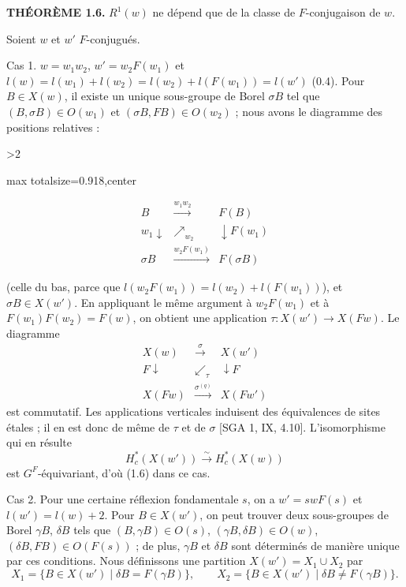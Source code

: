 \documentclass[9pt,twoside]{extarticle}
\newcommand{\EditionPage}[3]{%
  \ifnum#1>2\clearpage\fi
  \pdfbookmark[1]{Printed page #2}{fr-folio-#2}%
  \hypertarget{fr-physical-#1}{}%
  \noindent\begin{adjustbox}{max totalsize={\textwidth}{0.918\textheight},center}
  \begin{minipage}[t]{\textwidth}
  \fontsize{9.4}{11.1}\selectfont\justifying
  #3
  \end{minipage}
  \end{adjustbox}%
}
\begin{document}
{\noindent\textbf{THÉORÈME 1.6.} \(R^1(w)\) ne dépend que de la classe de \(F\)-conjugaison de \(w\).\par

Soient \(w\) et \(w'\)  \(F\)-conjugués.\par

Cas 1. \(w=w_1w_2\), \(w'=w_2F(w_1)\) et \(l(w)=l(w_1)+l(w_2)=l(w_2)+l(F(w_1))=l(w')\) (0.4). Pour \(B\in X(w)\), il existe un unique sous-groupe de Borel \(\sigma B\) tel que \((B,\sigma B)\in O(w_1)\) et \((\sigma B,FB)\in O(w_2)\) ; nous avons le diagramme des positions relatives :\par
}

\EditionPage{7}{108}{%
\[
\begin{array}{ccc}
B & \xrightarrow{w_1w_2} & F(B)\\
{\scriptstyle w_1}\downarrow & \nearrow_{\scriptstyle w_2} & \downarrow{\scriptstyle F(w_1)}\\
\sigma B & \xrightarrow{w_2F(w_1)} & F(\sigma B)
\end{array}
\]

(celle du bas, parce que \(l(w_2F(w_1))=l(w_2)+l(F(w_1))\)), et \(\sigma B\in X(w')\). En appliquant le même argument à \(w_2F(w_1)\) et à \(F(w_1)F(w_2)=F(w)\), on obtient une application \(\tau:X(w')\to X(Fw)\). Le diagramme \[
\begin{array}{ccc}
X(w) & \xrightarrow{\sigma} & X(w')\\
{\scriptstyle F}\downarrow & \swarrow_{\scriptstyle\tau} & \downarrow{\scriptstyle F}\\
X(Fw) & \xrightarrow{\sigma^{(q)}} & X(Fw')
\end{array}
\] est commutatif. Les applications verticales induisent des équivalences de sites étales ; il en est donc de même de \(\tau\) et de \(\sigma\) [SGA 1, IX, 4.10]. L'isomorphisme qui en résulte \[
H_c^*(X(w'))\xrightarrow{\sim}H_c^*(X(w))
\] est \(G^F\)-équivariant, d'où (1.6) dans ce cas.\par

Cas 2. Pour une certaine réflexion fondamentale \(s\), on a \(w'=swF(s)\) et \(l(w')=l(w)+2\). Pour \(B\in X(w')\), on peut trouver deux sous-groupes de Borel \(\gamma B\), \(\delta B\) tels que \((B,\gamma B)\in O(s)\), \((\gamma B,\delta B)\in O(w)\), \((\delta B,FB)\in O(F(s))\) ; de plus, \(\gamma B\) et \(\delta B\) sont déterminés de manière unique par ces conditions. Nous définissons une partition \(X(w')=X_1\cup X_2\) par \[
X_1=\{B\in X(w')\mid \delta B=F(\gamma B)\},\qquad
X_2=\{B\in X(w')\mid \delta B\ne F(\gamma B)\}.
\]\par

}
\end{document}
